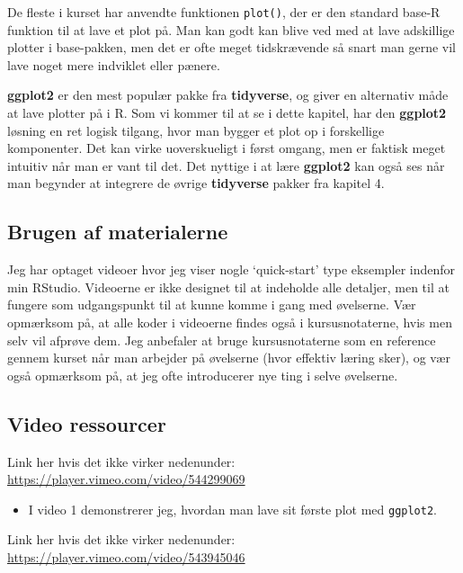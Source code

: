 \documentclass[
]{book}
\providecommand{\tightlist}{%
  \setlength{\itemsep}{0pt}\setlength{\parskip}{0pt}}
\begin{document}
De fleste i kurset har anvendte funktionen \texttt{plot()}, der er den standard base-R funktion til at lave et plot på. Man kan godt kan blive ved med at lave adskillige plotter i base-pakken, men det er ofte meget tidskrævende så snart man gerne vil lave noget mere indviklet eller pænere.

\textbf{ggplot2} er den mest populær pakke fra \textbf{tidyverse}, og giver en alternativ måde at lave plotter på i R. Som vi kommer til at se i dette kapitel, har den \textbf{ggplot2} løsning en ret logisk tilgang, hvor man bygger et plot op i forskellige komponenter. Det kan virke uoverskueligt i først omgang, men er faktisk meget intuitiv når man er vant til det. Det nyttige i at lære \textbf{ggplot2} kan også ses når man begynder at integrere de øvrige \textbf{tidyverse} pakker fra kapitel 4.

\hypertarget{brugen-af-materialerne}{%
\subsection{Brugen af materialerne}\label{brugen-af-materialerne}}

Jeg har optaget videoer hvor jeg viser nogle `quick-start' type eksempler indenfor min RStudio. Videoerne er ikke designet til at indeholde alle detaljer, men til at fungere som udgangspunkt til at kunne komme i gang med øvelserne. Vær opmærksom på, at alle koder i videoerne findes også i kursusnotaterne, hvis men selv vil afprøve dem. Jeg anbefaler at bruge kursusnotaterne som en reference gennem kurset når man arbejder på øvelserne (hvor effektiv læring sker), og vær også opmærksom på, at jeg ofte introducerer nye ting i selve øvelserne.

\hypertarget{video-ressourcer}{%
\subsection{Video ressourcer}\label{video-ressourcer}}

Link her hvis det ikke virker nedenunder: \url{https://player.vimeo.com/video/544299069}

\begin{itemize}
\tightlist
\item
  I video 1 demonstrerer jeg, hvordan man lave sit første plot med \texttt{ggplot2}.
\end{itemize}

Link her hvis det ikke virker nedenunder: \url{https://player.vimeo.com/video/543945046}
\end{document}
